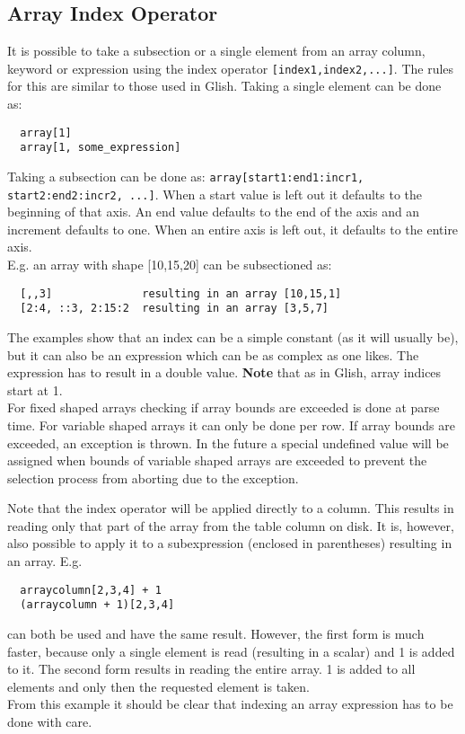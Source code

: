 \subsection{\label{TAQL:INDEXING}Array Index Operator}
It is possible to take a subsection or a
single element from an array column, keyword or expression
using the index operator
\texttt{[index1,index2,...]}. The rules for this
are similar to those used in Glish.
Taking a single element can be done as:
\begin{verbatim}
  array[1]
  array[1, some_expression]
\end{verbatim}
Taking a subsection can be done as:
\texttt{array[start1:end1:incr1, start2:end2:incr2, ...]}.
When a start value is left out it defaults to the beginning of
that axis. An end value defaults to the end of the axis and
an increment defaults to one. When an entire axis is left out,
it defaults to the entire axis.
\\E.g. an array with shape [10,15,20] can be subsectioned as:
\begin{verbatim}
  [,,3]              resulting in an array [10,15,1]
  [2:4, ::3, 2:15:2  resulting in an array [3,5,7]
\end{verbatim}
The examples show that an index can be a simple constant (as it will
usually be), but it can also be an expression which can be as complex
as one likes. The expression has to result in a double value.
\textbf{Note} that as in Glish, array indices start at 1.
\\For fixed shaped arrays checking if array bounds are exceeded
is done at parse time.
For variable shaped arrays
it can only be done per row. If array bounds are exceeded,
an exception is thrown. In the future a special undefined value
will be assigned when bounds of variable shaped arrays are exceeded
to prevent the selection process from aborting due to the exception.

Note that the index operator will be applied directly
to a column. This results in reading only that part of the
array from the table column on disk.
It is, however, also possible to apply it to a
subexpression (enclosed in parentheses) resulting in an array.
E.g.
\begin{verbatim}
  arraycolumn[2,3,4] + 1
  (arraycolumn + 1)[2,3,4]
\end{verbatim}
can both be used and have the same result. However, the first
form is much faster, because only a single element is read
(resulting in a scalar) and 1 is added to it.
The second form results in reading the entire array.
1 is added to all elements and only then the requested element is taken.
\\From this example it should be clear that indexing an array
expression has to be done with care.

